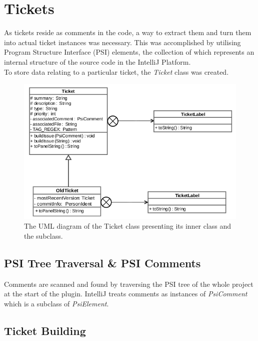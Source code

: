 \documentclass{4thYearProject}
\begin{document}
\section{Tickets}

As tickets reside as comments in the code, a way to extract them and turn them into actual ticket instances was necessary. This was accomplished by utilising Program Structure Interface (PSI) elements, the collection of which represents an internal structure of the source code in the IntelliJ Platform. \\

To store data relating to a particular ticket, the \textit{Ticket} class was created.

\begin{figure}[H]
\includegraphics[scale=0.6]{Ticket_UML}
\centering
\caption{The UML diagram of the Ticket class presenting its inner class and the subclass.}\label{ticketuml}
\label{fig:ticketuml}
\end{figure}

\subsection{PSI Tree Traversal \& PSI Comments}

Comments are scanned and found by traversing the PSI tree of the whole project at the start of the plugin. IntelliJ treats comments as instances of \textit{PsiComment} which is a subclass of \textit{PsiElement}.   

\subsection{Ticket Building}
\end{document}
